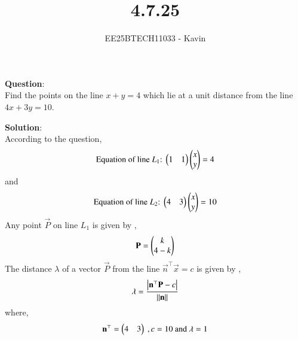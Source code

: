 \documentclass[journal]{IEEEtran}
\begin{document}

\vspace{3cm}

\title{4.7.25}
\author{EE25BTECH11033 - Kavin}
{\let\newpage\relax\maketitle}

\renewcommand{\thefigure}{\theenumi}
\renewcommand{\thetable}{\theenumi}
\setlength{\intextsep}{10pt} %
\textbf{Question}:\\
Find the points on the line $x+y=4$ which lie at a unit distance from the line $4x+3y=10$.\\
\bigskip


\textbf{Solution}:\\
According to the question,\\
\begin{align}
    \text{Equation of line $L_1$:}\ \begin{pmatrix}1&1\end{pmatrix}\begin{pmatrix}x\\y\end{pmatrix}=4
\end{align}
and
\begin{align}
    \text{Equation of line $L_2$:}\ \begin{pmatrix}4&3\end{pmatrix}\begin{pmatrix}x\\y\end{pmatrix}=10
\end{align}
Any point $\vec{P}$ on line $L_1$ is given by ,
\begin{align}
    \mathbf{P} = \begin{pmatrix}k\\4-k\end{pmatrix} 
\end{align}
The distance $\lambda$ of a vector $\vec{P}$ from the line $\vec{n}^{\top}\vec{x}=c$ is given by ,
\begin{align}
    \lambda = \frac{\left\vert\mathbf{n}^{\top}\mathbf{P} - c\right\vert}{\left\lVert\mathbf{n}\right\rVert}  
\end{align}
where,
\begin{align*}
    \mathbf{n}^\top = \begin{pmatrix}4&3\end{pmatrix}\ ,c = 10\ \text{and}\ \lambda=1
\end{align*}\\
\bigskip
\end{document}
